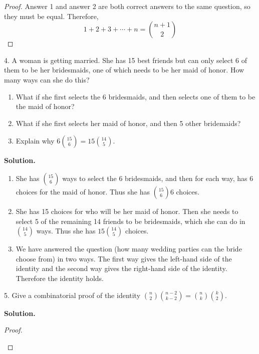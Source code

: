 \documentclass[10pt,]{book}
\theoremstyle{plain}
\theoremstyle{definition}
\theoremstyle{definition}
\theoremstyle{definition}
\numberwithin{equation}{section}
\begin{document}
\begin{exerciselist}
\begin{proof}
            Answer 1 and answer 2 are both correct answers to the same question, so they must be equal. Therefore,
            \begin{equation*}
              1 + 2 + 3 + \cdots + n = {n+1 \choose 2}
            \end{equation*}
\end{proof}
\item[4.]\hypertarget{exercise-75}{}
          A woman is getting married. She has 15 best friends but can only select 6 of them to be her bridesmaids, one of which needs to be her maid of honor. How many ways can she do this?
\leavevmode%
\begin{enumerate}[label=(\alph*)]
\item\hypertarget{li-526}{} What if she first selects the 6 bridesmaids, and then selects one of them to be the maid of honor? %
\item\hypertarget{li-527}{} What if she first selects her maid of honor, and then 5 other bridemaids? %
\item\hypertarget{li-528}{} Explain why \(6 {15 \choose 6} = 15 {14 \choose 5}\). %
\end{enumerate}
\par\smallskip
\par\smallskip
\noindent\textbf{Solution.}\hypertarget{solution-112}{}\quad
\leavevmode%
\begin{enumerate}[label=(\alph*)]
\item\hypertarget{li-529}{} She has \({15 \choose 6}\) ways to select the 6 bridesmaids, and then for each way, has 6 choices for the maid of honor.  Thus she has \({15 \choose 6}6\) choices. %
\item\hypertarget{li-530}{} She has 15 choices for who will be her maid of honor.  Then she needs to select 5 of the remaining 14 friends to be bridesmaids, which she can do in \({14 \choose 5}\) ways.  Thus she has \(15 {14 \choose 5}\) choices. %
\item\hypertarget{li-531}{} We have answered the question (how many wedding parties can the bride choose from) in two ways.  The first way gives the left-hand side of the identity and the second way gives the right-hand side of the identity.  Therefore the identity holds. %
\end{enumerate}
\item[5.]\hypertarget{exercise-76}{}
          Give a combinatorial proof of the identity \({n \choose 2}{n-2 \choose k-2} = {n\choose k}{k \choose 2}\).
\par\smallskip
\par\smallskip
\noindent\textbf{Solution.}\hypertarget{solution-113}{}\quad
\begin{proof}\hypertarget{proof-10}{}


\end{proof}
\end{exerciselist}
\end{document}

